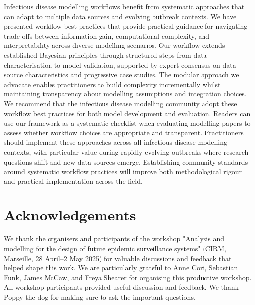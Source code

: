 \documentclass{article}
\begin{document}
Infectious disease modelling workflows benefit from systematic approaches that can adapt to multiple data sources and evolving outbreak contexts.
We have presented workflow best practices that provide practical guidance for navigating trade-offs between information gain, computational complexity, and interpretability across diverse modelling scenarios.
Our workflow extends established Bayesian principles through structured steps from data characterisation to model validation, supported by expert consensus on data source characteristics and progressive case studies.
The modular approach we advocate enables practitioners to build complexity incrementally whilst maintaining transparency about modelling assumptions and integration choices.
We recommend that the infectious disease modelling community adopt these workflow best practices for both model development and evaluation.
Readers can use our framework as a systematic checklist when evaluating modelling papers to assess whether workflow choices are appropriate and transparent.
Practitioners should implement these approaches across all infectious disease modelling contexts, with particular value during rapidly evolving outbreaks where research questions shift and new data sources emerge.
Establishing community standards around systematic workflow practices will improve both methodological rigour and practical implementation across the field.

\section{Acknowledgements}

We thank the organisers and participants of the workshop "Analysis and modelling for the design of future epidemic surveillance systems" (CIRM, Marseille, 28 April–2 May 2025) for valuable discussions and feedback that helped shape this work.
We are particularly grateful to Anne Cori, Sebastian Funk, James McCaw, and Freya Shearer for organising this productive workshop.
All workshop participants provided useful discussion and feedback.
We thank Poppy the dog for making sure to ask the important questions.



\end{document}
